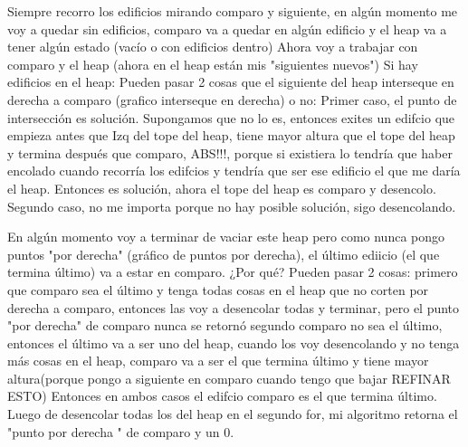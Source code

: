 \documentclass{article}
\begin{document}
Siempre recorro los edificios mirando comparo y siguiente, en algún momento me voy a quedar sin edificios, comparo va a quedar en algún edificio y el heap va a tener algún estado (vacío o con edificios dentro)
Ahora voy a trabajar con comparo y el heap (ahora en el heap están mis "siguientes nuevos")
Si hay edificios en el heap: \newline
Pueden pasar 2 cosas que el siguiente del heap interseque en derecha a comparo (grafico interseque en derecha) o no: \newline
Primer caso, el punto de intersección es solución. \newline 
Supongamos que no lo es, entonces exites un edifcio que empieza antes que Izq del tope del heap, tiene mayor altura que el tope del heap y termina después que comparo, ABS!!!, porque si existiera lo tendría que haber encolado cuando recorría los edifcios y tendría que ser ese edificio el que me daría el heap.
Entonces es solución, ahora el tope del heap es comparo y desencolo.
Segundo caso, no me importa porque no hay posible solución, sigo desencolando.

En algún momento voy a terminar de vaciar este heap pero como nunca pongo puntos "por derecha" (gráfico de puntos por derecha), el último ediicio (el que termina último) va a estar en comparo.
¿Por qué? Pueden pasar 2 cosas:
 primero que comparo sea el último y tenga todas cosas en el heap que no corten por derecha a comparo, entonces las voy a desencolar todas y terminar, pero el punto "por derecha" de comparo nunca se retornó
 segundo comparo no sea el último, entonces el último va a ser uno del heap, cuando los voy desencolando y no tenga más cosas en el heap, comparo va a ser el que termina último y tiene mayor altura(porque pongo a siguiente en comparo cuando tengo que bajar REFINAR ESTO)
Entonces en ambos casos el edifcio comparo es el que termina último.
Luego de desencolar todas los del heap en el segundo for, mi algoritmo retorna el "punto por derecha " de comparo y un 0.




 
		
	\color{red}{NO ME GUSTA NADA ESTA DEMO! igual no es la final}\color{black}
\end{document}
